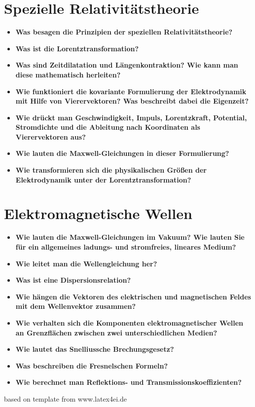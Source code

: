 \documentclass[german]{latex4ei/latex4ei_sheet}
\begin{document}
\section{Spezielle Relativitätstheorie}
\begin{itemize}
	\item \textbf{Was besagen die Prinzipien der speziellen Relativitätstheorie?}
	\item \textbf{Was ist die Lorentztransformation?}
	\item \textbf{Was sind Zeitdilatation und Längenkontraktion? Wie kann man diese mathematisch herleiten?}
	\item \textbf{Wie funktioniert die kovariante Formulierung der Elektrodynamik mit Hilfe von Vierervektoren? Was beschreibt dabei die Eigenzeit?}
	\item \textbf{Wie drückt man Geschwindigkeit, Impuls, Lorentzkraft, Potential, Stromdichte und die Ableitung nach Koordinaten als Vierervektoren aus?}
	\item \textbf{Wie lauten die Maxwell-Gleichungen in dieser Formulierung?}
	\item \textbf{Wie transformieren sich die physikalischen Größen der Elektrodynamik unter der Lorentztransformation?}
\end{itemize}
\section{Elektromagnetische Wellen}
\begin{itemize}
	\item \textbf{Wie lauten die Maxwell-Gleichungen im Vakuum? Wie lauten Sie für ein allgemeines ladungs- und stromfreies, lineares Medium?}
	\item \textbf{Wie leitet man die Wellengleichung her?}
	\item \textbf{Was ist eine Dispersionsrelation?}
	\item \textbf{Wie hängen die Vektoren des elektrischen und magnetischen Feldes mit dem Wellenvektor zusammen?}
	\item \textbf{Wie verhalten sich die Komponenten elektromagnetischer Wellen an Grenzflächen zwischen zwei unterschiedlichen Medien?}
	\item \textbf{Wie lautet das Snelliussche Brechungsgesetz?}
	\item \textbf{Was beschreiben die Fresnelschen Formeln?}
	\item \textbf{Wie berechnet man Reflektions- und Transmissionskoeffizienten?}
\end{itemize}

\tiny{based on template from www.latex4ei.de}
\end{document}
